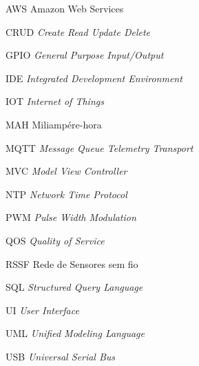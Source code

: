 %
%

\begin{siglas}
    \vspace{1.5\baselineskip}
	\item[AWS]  Amazon Web Services
	\item[CRUD] \textit{Create Read Update Delete}
	\item[GPIO] \textit{General Purpose Input/Output}
	\item[IDE]  \textit{Integrated Development Environment}
	\item[IOT]  \textit{Internet of Things}
	\item[MAH]  Miliampére-hora
	\item[MQTT] \textit{Message Queue Telemetry Transport}
	\item[MVC]  \textit{Model View Controller}
	\item[NTP]  \textit{Network Time Protocol}
	\item[PWM]  \textit{Pulse Width Modulation}
	\item[QOS]  \textit{Quality of Service}
	\item[RSSF] Rede de Sensores sem fio
	\item[SQL]  \textit{Structured Query Language}
	\item[UI]   \textit{User Interface}
	\item[UML]  \textit{Unified Modeling Language}
	\item[USB]  \textit{Universal Serial Bus}
\end{siglas}
